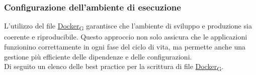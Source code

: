 \subsubsection{Configurazione dell'ambiente di esecuzione}
L'utilizzo del file \href{https://7last.github.io/docs/rtb/documentazione-interna/glossario\#docker}{Docker\textsubscript{G}} garantisce che l'ambiente di sviluppo e produzione sia coerente e riproducibile. Questo approccio non solo assicura che le applicazioni funzionino correttamente in ogni fase del ciclo di vita, ma permette anche una gestione più efficiente delle dipendenze e delle configurazioni.\\
Di seguito un elenco delle best practice per la scrittura di file \href{https://7last.github.io/docs/rtb/documentazione-interna/glossario\#docker}{Docker\textsubscript{G}}.

